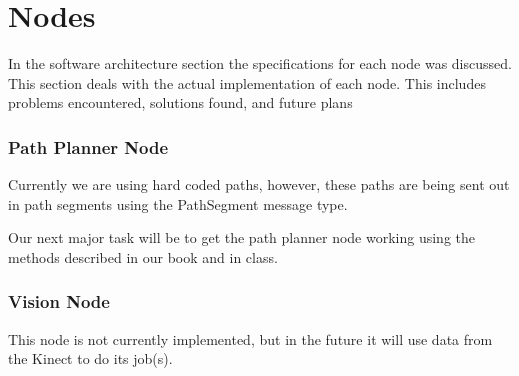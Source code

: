 \part{Nodes}
In the software architecture section the specifications for each node
was discussed.  This section deals with the actual implementation of
each node.  This includes problems encountered, solutions found, and
future plans









\section{Path Planner Node}
Currently we are using hard coded paths, however, these paths are
being sent out in path segments using the PathSegment message type.

Our next major task will be to get the path planner node working using
the methods described in our book and in class.

\section{Vision Node}

This node is not currently implemented, but in the future it will use
data from the Kinect to do its job(s).
